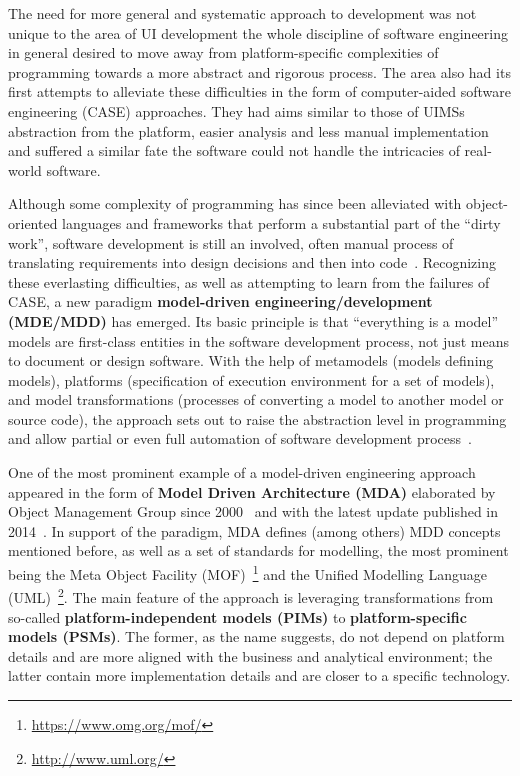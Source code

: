 The need for more general and systematic approach to development was not unique to the area of UI development\,\textendash\,the whole discipline of software engineering in general desired to move away from platform-specific complexities of programming towards a more abstract and rigorous process.
The area also had its first attempts to alleviate these difficulties in the form of computer-aided software engineering (CASE) approaches.
They had aims similar to those of UIMSs\,\textendash\,abstraction from the platform, easier analysis and less manual implementation\,\textendash\,and suffered a similar fate\,\textendash\,the software could not handle the intricacies of real-world software.

Although some complexity of programming has since been alleviated with object-oriented languages and frameworks that perform a substantial part of the \enquote{dirty work}, software development is still an involved, often manual process of translating requirements into design decisions and then into code~\cite{Schmidt2006}.
Recognizing these everlasting difficulties, as well as attempting to learn from the failures of CASE, a new paradigm\,\textendash\,\textbf{model-driven engineering/development (MDE/MDD)}\,\textendash\,has emerged.
Its basic principle is that \enquote{everything is a model}~\cite{bezivin2004search}\,\textendash\,models are first-class entities in the software development process, not just means to document or design software.
With the help of metamodels (models defining models), platforms (specification of execution environment for a set of models), and model transformations (processes of converting a model to another model or source code), the approach sets out to raise the abstraction level in programming and allow partial or even full automation of software development process~\cite{mellor2004mda}.

One of the most prominent example of a model-driven engineering approach appeared in the form of \textbf{Model Driven Architecture (MDA)} elaborated by Object Management Group since 2000~\cite{richard_soley_model_2000} and with the latest update published in 2014~\cite{mda_2014}.
In support of the paradigm, MDA defines (among others) MDD concepts mentioned before, as well as a set of standards for modelling, the most prominent being the Meta Object Facility (MOF)~\footnote{\url{https://www.omg.org/mof/}} and the Unified Modelling Language (UML)~\footnote{\url{http://www.uml.org/}}.
The main feature of the approach is leveraging transformations from so-called \textbf{platform-independent models (PIMs)} to \textbf{platform-specific models (PSMs)}.
The former, as the name suggests, do not depend on platform details and are more aligned with the business and analytical environment;
the latter contain more implementation details and are closer to a specific technology.

